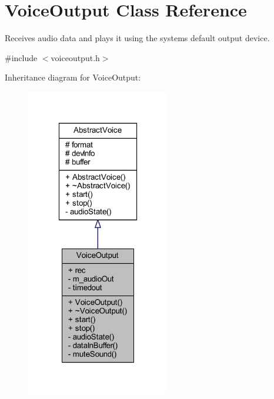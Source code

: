 \hypertarget{class_voice_output}{
\section{\-Voice\-Output \-Class \-Reference}
\label{class_voice_output}
}


\-Receives audio data and plays it using the systems default output device.  




{\ttfamily \#include $<$voiceoutput.\-h$>$}



\-Inheritance diagram for \-Voice\-Output\-:\nopagebreak
\begin{figure}[H]
\begin{center}
\leavevmode
\includegraphics[width=178pt]{class_voice_output__inherit__graph}
\end{center}
\end{figure}


